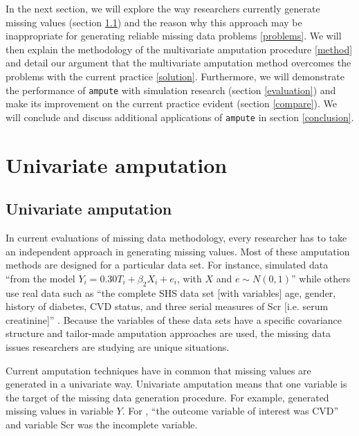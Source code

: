 \documentclass[11pt,a4paper]{article}
\newcommand{\code}[1]{\texttt{#1}}
\begin{document}
In the next section, we will explore the way researchers currently generate missing values (section \ref{current}) and the reason why this approach may be inappropriate for generating reliable missing data problems \eqref{problems}. We will then explain the methodology of the multivariate amputation procedure \eqref{method} and detail our argument that the multivariate amputation method overcomes the problems with the current practice \eqref{solution}. Furthermore, we will demonstrate the performance of \code{ampute} with simulation research (section \ref{evaluation}) and make its improvement on the current practice evident (section \ref{compare}). We will conclude and discuss additional applications of \code{ampute} in section \ref{conclusion}. 

\section{Univariate amputation}

\subsection{\normalsize Univariate amputation}\label{current}

In current evaluations of missing data methodology, every researcher has to take an independent approach in generating missing values. Most of these amputation methods are designed for a particular data set. For instance, \citet[][p. 4]{Sullivan2016} simulated data ``from the model $Y_i = 0.30T_i + \beta_2X_i + e_i$, with $X$ and $e \sim N(0, 1)$'' while others use real data such as ``the complete SHS data set [with variables] age, gender, history of diabetes, CVD status, and three serial measures of Scr [i.e. serum creatinine]'' \citep[][p. 3]{Shara2015}. Because the variables of these data sets have a specific covariance structure and tailor-made amputation approaches are used, the missing data issues researchers are studying are unique situations.

Current amputation techniques have in common that missing values are generated in a univariate way. Univariate amputation means that one variable is the target of the missing data generation procedure. For example, \citet{Sullivan2016} generated missing values in variable $Y$. For \citet[][p. 3]{Shara2015}, ``the outcome variable of interest was CVD'' and variable Scr was the incomplete variable. 
\end{document}
